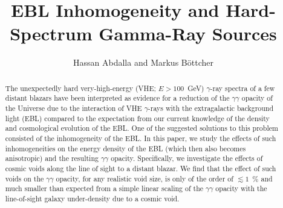 \documentclass{aastex6}
\begin{document}
\title{EBL Inhomogeneity and Hard-Spectrum Gamma-Ray Sources}
\author{Hassan Abdalla  and Markus B\"{o}ttcher}



\begin{abstract}
The unexpectedly hard very-high-energy (VHE; $E > 100$~GeV) $\gamma$-ray spectra of a few distant 
blazars have been interpreted as evidence for a reduction of the $\gamma\gamma$ opacity of the 
Universe due to the interaction of VHE $\gamma$-rays with the extragalactic background light (EBL)
compared to the expectation from our current knowledge of the density and cosmological evolution of
the EBL. One of the suggested solutions to this problem consisted of the inhomogeneity of the EBL.
In this paper, we study the effects of such inhomogeneities on the energy density of the EBL 
(which then also becomes anisotropic) and the resulting $\gamma\gamma$ opacity. Specifically, 
we investigate the effects of cosmic voids along the line of sight to a distant blazar. We find that
the effect of such voids on the $\gamma\gamma$ opacity, for any realistic void size, is only of the 
order of $\lesssim 1$~\% and much smaller than expected from a simple linear scaling of the $\gamma\gamma$
opacity with the line-of-sight galaxy under-density due to a cosmic void. 
\end{abstract}


\end{document}
